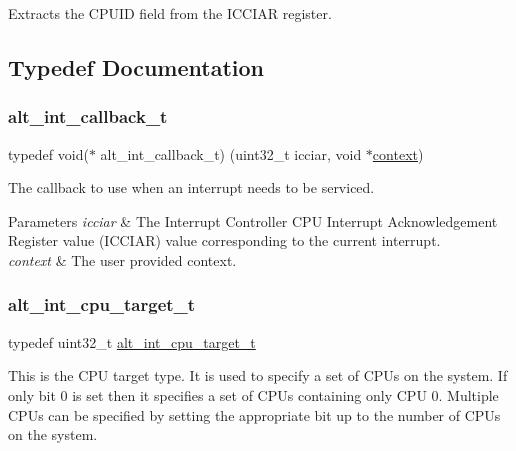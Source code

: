 Extracts the C\+P\+U\+ID field from the I\+C\+C\+I\+AR register. 

\subsection{Typedef Documentation}
\mbox{\label{group__INT__COMMON_gace129e79f7e2eee4b0cfc7a0cc297053}} 
\subsubsection{\texorpdfstring{alt\_int\_callback\_t}{alt\_int\_callback\_t}}
{\footnotesize\ttfamily typedef void($\ast$ alt\+\_\+int\+\_\+callback\+\_\+t) (uint32\+\_\+t icciar, void $\ast$\mbox{\hyperlink{sun4u_2tte_8h_a9b4a99475e2709333b8e5d70483173f1}{context}})}

The callback to use when an interrupt needs to be serviced.


\begin{DoxyParams}{Parameters}
{\em icciar} & The Interrupt Controller C\+PU Interrupt Acknowledgement Register value (I\+C\+C\+I\+AR) value corresponding to the current interrupt.\\
\hline
{\em context} & The user provided context. \\
\hline
\end{DoxyParams}
\mbox{\label{group__INT__COMMON_ga0986f657275460bf46c91f02b77c8667}} 
\subsubsection{\texorpdfstring{alt\_int\_cpu\_target\_t}{alt\_int\_cpu\_target\_t}}
{\footnotesize\ttfamily typedef uint32\+\_\+t \mbox{\hyperlink{group__INT__COMMON_ga0986f657275460bf46c91f02b77c8667}{alt\+\_\+int\+\_\+cpu\+\_\+target\+\_\+t}}}

This is the C\+PU target type. It is used to specify a set of C\+P\+Us on the system. If only bit 0 is set then it specifies a set of C\+P\+Us containing only C\+PU 0. Multiple C\+P\+Us can be specified by setting the appropriate bit up to the number of C\+P\+Us on the system. \mbox{\label{group__INT__COMMON_ga394d3efae4a3ee1015ed47f9698deea6}} 
